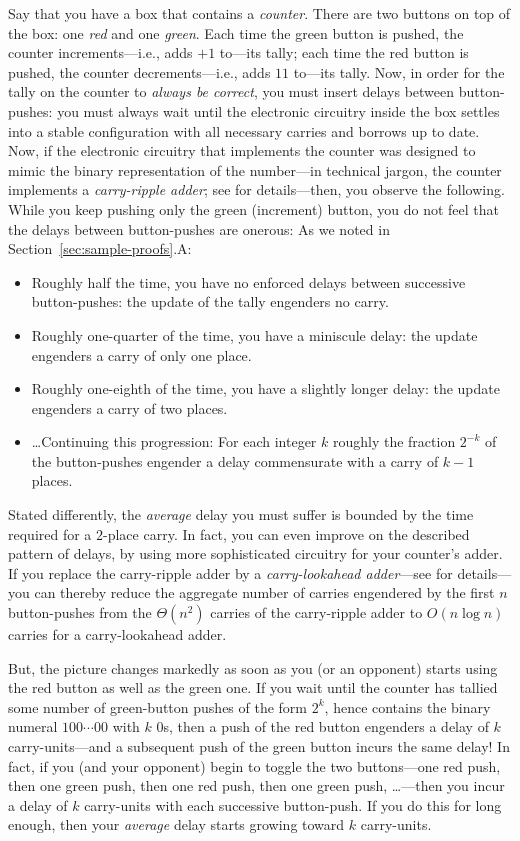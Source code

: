 Say that you have a box that contains a {\it counter}.  There are two
buttons on top of the box: one {\em red} and one {\em green}.  Each
time the green button is pushed, the counter increments---i.e., adds
$+1$ to---its tally; each time the red button is pushed, the counter
decrements---i.e., adds $11$ to---its tally.  Now, in order for the
tally on the counter to {\em always be correct}, you must insert
delays between button-pushes: you must always wait until the
electronic circuitry inside the box settles into a stable
configuration with all necessary carries and borrows up to date.  Now,
if the electronic circuitry that implements the counter was designed
to mimic the binary representation of the number---in technical
jargon,  the counter implements a {\it
  carry-ripple adder}; see \cite{Hwang79} for details---then, you
observe the following.  While you keep pushing only the green
(increment) button, you do not feel that the delays between
button-pushes are onerous: As we noted in
Section~\ref{sec:sample-proofs}.A:
\begin{itemize}
\item
Roughly half the time, you have no enforced delays between successive
button-pushes: the update of the tally engenders no carry.
\item
Roughly one-quarter of the time, you have a miniscule delay: the
update engenders a carry of only one place.
\item
Roughly one-eighth of the time, you have a slightly longer delay: the
update engenders a carry of two places.
\item
\ldots Continuing this progression: For each integer $k$ roughly the
fraction $2^{-k}$ of the button-pushes engender a delay commensurate
with a carry of $k-1$ places.
\end{itemize}
Stated differently, the {\em average} delay you must suffer is bounded
by the time required for a $2$-place carry.  In fact, you can even
improve on the described pattern of delays, by using more
sophisticated circuitry for your counter's adder.  If you replace the
carry-ripple adder by a {\it carry-lookahead adder}---see
\cite{Hwang79} for details---you can thereby reduce the aggregate
number of carries engendered by the first $n$ button-pushes from the
$\Theta(n^2)$ carries of the carry-ripple adder to $O(n \log n)$
carries for a carry-lookahead adder.

But, the picture changes markedly as soon as you (or an opponent)
starts using the red button as well as the green one.  If you wait
until the counter has tallied some number of green-button pushes of
the form $2^k$, hence contains the binary numeral $100 \cdots 00$ with
$k$ $0$s, then a push of the red button engenders a delay of $k$
carry-units---and a subsequent push of the green button incurs the
same delay!  In fact, if you (and your opponent) begin to toggle the
two buttons---one red push, then one green push, then one red push,
then one green push, \ldots---then you incur a delay of $k$
carry-units with each successive button-push.  If you do this for long
enough, then your {\em average} delay starts growing toward $k$
carry-units.

